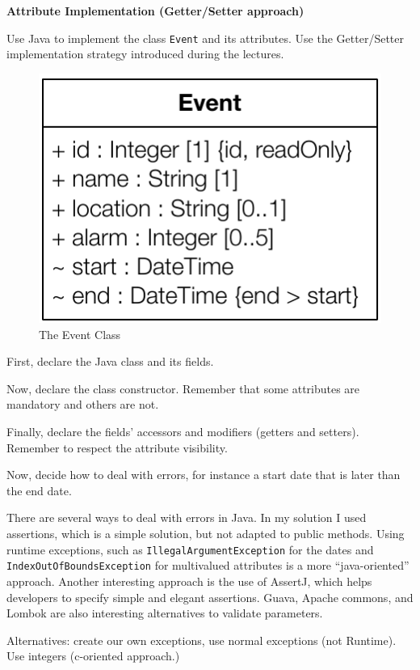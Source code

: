 \documentclass[a4paper,11pt]{memoir}
\newcommand{\code}[1]{\lstinline{#1}}
\begin{document}
\begin{exercise}
	\textbf{Attribute Implementation (Getter/Setter approach)} 
	
Use Java to implement the class \code{Event} and its attributes. 
Use the Getter/Setter implementation strategy introduced during the lectures.  


\begin{figure}[htbp]
	\centering
		\includegraphics[width=.4\linewidth]{CD-Event.pdf}
	\caption{The Event Class}
	\label{fig:event}
\end{figure}	

\begin{inparaenum}[(A)]
	\item First, declare the Java class and its fields.
	\item Now, declare the class constructor. Remember that some attributes are mandatory and others are not.
	\item Finally, declare the fields' accessors and modifiers (getters and setters). Remember to respect the attribute visibility.
	\item Now, decide how to deal with errors, for instance a start date that is later than the end date. 
\end{inparaenum}
\end{exercise}

\begin{solution}
			There are several ways to deal with errors in Java. In my solution I used assertions, which is a simple solution, but not adapted to public methods. Using runtime exceptions, such as \code{IllegalArgumentException} for the dates and \code{IndexOutOfBoundsException} for multivalued attributes is a more ``java-oriented'' approach. Another interesting approach is the use of AssertJ, which helps developers to specify simple and elegant assertions. Guava, Apache commons, and Lombok are also interesting alternatives to validate parameters.
			
			Alternatives: create our own exceptions, use normal exceptions (not Runtime). Use integers (c-oriented approach.)



\end{solution}
	
\end{document}
